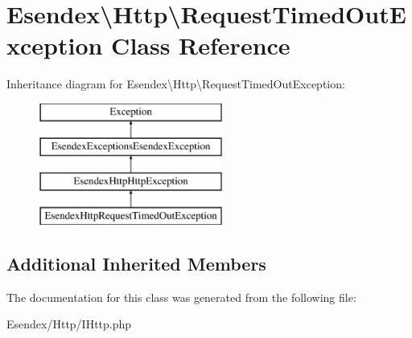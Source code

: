 \section{Esendex\textbackslash{}Http\textbackslash{}Request\-Timed\-Out\-Exception Class Reference}
\label{class_esendex_1_1_http_1_1_request_timed_out_exception}
Inheritance diagram for Esendex\textbackslash{}Http\textbackslash{}Request\-Timed\-Out\-Exception\-:\begin{figure}[H]
\begin{center}
\leavevmode
\includegraphics[height=4.000000cm]{class_esendex_1_1_http_1_1_request_timed_out_exception}
\end{center}
\end{figure}
\subsection*{Additional Inherited Members}


The documentation for this class was generated from the following file\-:\begin{DoxyCompactItemize}
\item 
Esendex/\-Http/I\-Http.\-php\end{DoxyCompactItemize}
